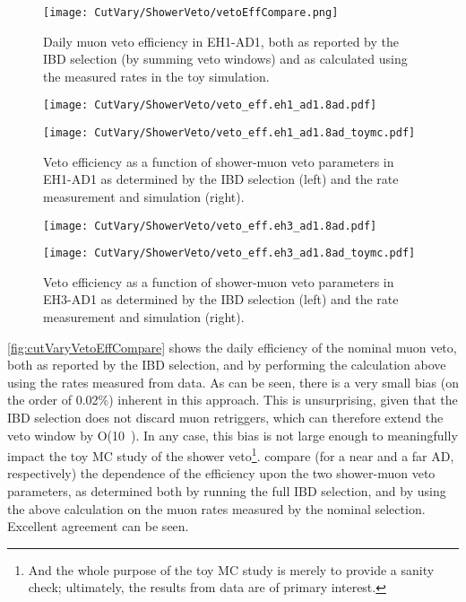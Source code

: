 \documentclass[../thesis.tex]{subfiles}
\begin{document}
\begin{figure}[ht]
  \texttt{[image: CutVary/ShowerVeto/vetoEffCompare.png]}
  \caption{Daily muon veto efficiency in EH1-AD1, both as reported by the IBD selection (by summing veto windows) and as calculated using the measured rates in the toy simulation.}
  \label{fig:cutVaryVetoEffCompare}
\end{figure}

\begin{figure}[ht]
  \begin{minipage}{0.5\linewidth}%
    \texttt{[image: CutVary/ShowerVeto/veto\_eff.eh1\_ad1.8ad.pdf]}%
  \end{minipage}%
  \begin{minipage}{0.5\linewidth}%
  \texttt{[image: CutVary/ShowerVeto/veto\_eff.eh1\_ad1.8ad\_toymc.pdf]}%
  \end{minipage}%
  \caption{Veto efficiency as a function of shower-muon veto parameters in EH1-AD1 as determined by the IBD selection (left) and the rate measurement and simulation (right).}
  \label{fig:cutVaryVetoEff2dNear}
\end{figure}

\begin{figure}[ht]
  \begin{minipage}{0.5\linewidth}%
    \texttt{[image: CutVary/ShowerVeto/veto\_eff.eh3\_ad1.8ad.pdf]}%
  \end{minipage}%
  \begin{minipage}{0.5\linewidth}%
    \texttt{[image: CutVary/ShowerVeto/veto\_eff.eh3\_ad1.8ad\_toymc.pdf]}%
  \end{minipage}%
  \caption{Veto efficiency as a function of shower-muon veto parameters in EH3-AD1 as determined by the IBD selection (left) and the rate measurement and simulation (right).}
  \label{fig:cutVaryVetoEff2dFar}
\end{figure}

\autoref{fig:cutVaryVetoEffCompare} shows the daily efficiency of the nominal muon veto, both as reported by the IBD selection, and by performing the calculation above using the rates measured from data. As can be seen, there is a very small bias (on the order of 0.02\%) inherent in this approach. This is unsurprising, given that the IBD selection does not discard muon retriggers, which can therefore extend the veto window by O(10~\us). In any case, this bias is not large enough to meaningfully impact the toy MC study of the shower veto\footnote{And the whole purpose of the toy MC study is merely to provide a sanity check; ultimately, the results from data are of primary interest.}.  compare (for a near and a far AD, respectively) the dependence of the efficiency upon the two shower-muon veto parameters, as determined both by running the full IBD selection, and by using the above calculation on the muon rates measured by the nominal selection. Excellent agreement can be seen.
\end{document}
